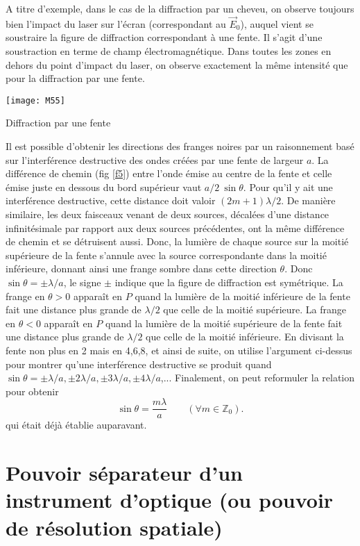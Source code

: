 \noindent A titre d'exemple, dans le cas de la diffraction par un cheveu, on observe toujours bien l'impact du laser sur l'écran (correspondant au $\overset\rightarrow{E}_0$), auquel vient se soustraire la figure de diffraction correspondant à une fente. Il s'agit d'une soustraction en terme de champ électromagnétique. Dans toutes les zones en dehors du point d'impact du laser, on observe exactement la même intensité que pour la diffraction par une fente.


\begin{marginfigure}[2cm]
\texttt{[image: M55]}
\caption{Diffraction par une fente}
\label{f5}
\end{marginfigure}

\noindent Il est possible d'obtenir les directions des franges noires par un raisonnement basé sur l'interférence destructive des ondes créées par une fente de largeur $a$. La différence de chemin (fig \ref{f5}) entre l'onde émise au centre de la fente et celle émise juste en dessous du bord supérieur vaut $a/2\:\sin\theta$. Pour qu'il y ait une interférence destructive, cette distance doit valoir $(2m+1)\lambda/2$. De manière similaire, les deux faisceaux venant de deux sources, décalées d'une distance infinitésimale par rapport aux deux sources précédentes, ont la même différence de chemin et se détruisent aussi. Donc, la lumière de chaque source sur la moitié supérieure de la fente s'annule avec la source correspondante dans la moitié inférieure, donnant ainsi une frange sombre dans cette direction $\theta$. Donc $\sin\theta=\pm\lambda/a$, le signe $\pm$ indique que la figure de diffraction est symétrique. La frange en $\theta>0$ apparaît en $P$ quand la lumière de la moitié inférieure de la fente fait une distance plus grande de $\lambda/2$ que celle de la moitié supérieure. La frange en $\theta<0$ apparaît en $P$ quand la lumière de la moitié supérieure de la fente fait une distance plus grande de $\lambda/2$ que celle de la moitié inférieure. En divisant la fente non plus en 2 mais en 4,6,8, et ainsi de suite, on utilise l'argument ci-dessus pour montrer qu'une interférence destructive se produit quand $\sin\theta=\pm\lambda/a,\pm2\lambda/a,\pm3\lambda/a,\pm4\lambda/a$,...
Finalement, on peut reformuler la relation pour obtenir
$$
    \sin\theta=\frac{m\lambda}{a}\qquad(\forall m\in  \mathbb{Z}_0).
$$
qui était déjà établie auparavant.

\section{Pouvoir séparateur d'un instrument d'optique (ou pouvoir de résolution spatiale) }

